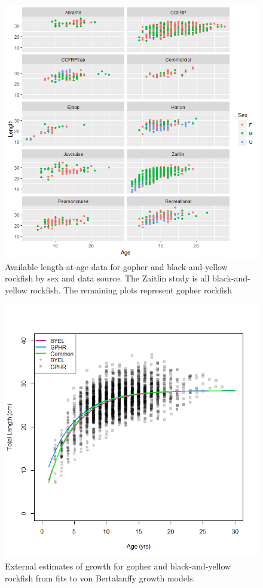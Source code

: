 \documentclass[12pt,]{article}
\begin{document}
\begin{figure}
\centering
\includegraphics{Figures/Age_length_by_study.png}
\caption{Available length-at-age data for gopher and black-and-yellow
rockfish by sex and data source. The Zaitlin study is all
black-and-yellow rockfish. The remaining plots represent gopher rockfish
\label{fig:Age_length_by_study}}
\end{figure}

\begin{figure}
\centering
\includegraphics{Figures/Growth_by_species.png}
\caption{External estimates of growth for gopher and black-and-yellow
rockfish from fits to von Bertalanffy growth models.
\label{Growth_by_species}}
\end{figure}
\end{document}
